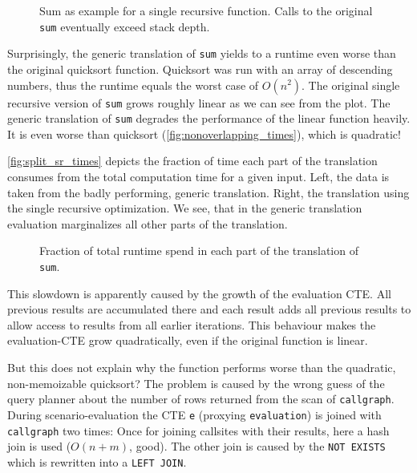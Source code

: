 \begin{figure}[h!]
    \centering
    
    \caption{Sum as example for a single recursive function. Calls to the original \texttt{sum} eventually exceed stack depth.}
    \label{fig:factorial_times}
\end{figure}


Surprisingly, the generic translation of \texttt{sum} yields to a runtime even worse than the original quicksort function. Quicksort was run with an array of descending numbers, thus the runtime equals the worst case of $O(n^2)$. The original single recursive version of \texttt{sum} grows roughly linear as we can see from the plot. The generic translation of \texttt{sum} degrades the performance of the linear function heavily. It is even worse than quicksort (\autoref{fig:nonoverlapping_times}), which is quadratic!

\autoref{fig:split_sr_times} depicts the fraction of time each part of the translation consumes from the total computation time for a given input. Left, the data is taken from the badly performing, generic translation. Right, the translation using the single recursive optimization. We see, that in the generic translation evaluation marginalizes all other parts of the translation.

\begin{figure}[h!]
    \centering
    
    \caption{Fraction of total runtime spend in each part of the translation of \texttt{sum}.}
    \label{fig:split_sr_times}
\end{figure}

This slowdown is apparently caused by the growth of the evaluation CTE. All previous results are accumulated there and each result adds all previous results to allow access to results from all earlier iterations. This behaviour makes the evaluation-CTE grow quadratically, even if the original function is linear.

But this does not explain why the function performs worse than the quadratic, non-memoizable quicksort? The problem is caused by the wrong guess of the query planner about the number of rows returned from the scan of \texttt{callgraph}. During scenario-evaluation the CTE \texttt{e} (proxying \texttt{evaluation}) is joined with \texttt{callgraph} two times: Once for joining callsites with their results, here a hash join is used ($O(n+m)$, good). The other join is caused by the \texttt{NOT EXISTS} which is rewritten into a \texttt{LEFT JOIN}.

